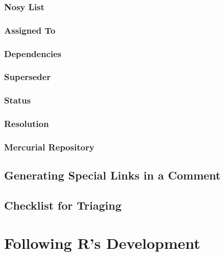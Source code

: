 \documentclass[]{book}
\begin{document}
\hypertarget{nosy-list}{%
\subsection{Nosy List}\label{nosy-list}}

\hypertarget{assigned-to}{%
\subsection{Assigned To}\label{assigned-to}}

\hypertarget{dependencies}{%
\subsection{Dependencies}\label{dependencies}}

\hypertarget{superseder}{%
\subsection{Superseder}\label{superseder}}

\hypertarget{status}{%
\subsection{Status}\label{status}}

\hypertarget{resolution}{%
\subsection{Resolution}\label{resolution}}

\hypertarget{mercurial-repository}{%
\subsection{Mercurial Repository}\label{mercurial-repository}}

\hypertarget{generating-special-links-in-a-comment}{%
\section{Generating Special Links in a Comment}\label{generating-special-links-in-a-comment}}

\hypertarget{checklist-for-triaging}{%
\section{Checklist for Triaging}\label{checklist-for-triaging}}

\hypertarget{following-rs-development}{%
\chapter{Following R's Development}\label{following-rs-development}}
\end{document}
